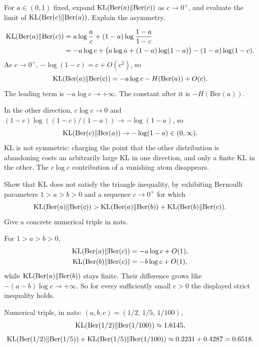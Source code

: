 \begin{hwqbox}
For $a\in(0,1)$ fixed, expand $\mathrm{KL}(\mathrm{Ber}(a)\Vert\mathrm{Ber}(c))$ as $c\to 0^+$, and evaluate the limit of $\mathrm{KL}(\mathrm{Ber}(c)\Vert\mathrm{Ber}(a))$. Explain the asymmetry.
\end{hwqbox}
\begin{hwsolbox}
\begin{align*}
\mathrm{KL}(\mathrm{Ber}(a)\Vert\mathrm{Ber}(c))
&=a\log\frac ac+(1-a)\log\frac{1-a}{1-c}\\
&=-a\log c+\bigl(a\log a+(1-a)\log(1-a)\bigr)-(1-a)\log(1-c).
\end{align*}
As $c\to 0^+$, $-\log(1-c)=c+O(c^2)$, so
\[
\mathrm{KL}(\mathrm{Ber}(a)\Vert\mathrm{Ber}(c))
=-a\log c-H(\mathrm{Ber}(a))+O(c).
\]
The leading term is $-a\log c\to+\infty$. The constant after it is $-H(\mathrm{Ber}(a))$.

In the other direction, $c\log c\to 0$ and $(1-c)\log((1-c)/(1-a))\to-\log(1-a)$, so
\[
\mathrm{KL}(\mathrm{Ber}(c)\Vert\mathrm{Ber}(a))\to-\log(1-a)\in(0,\infty).
\]
KL is not symmetric: charging the point that the other distribution is abandoning costs an arbitrarily large KL in one direction, and only a finite KL in the other. The $c\log c$ contribution of a vanishing atom disappears.
\end{hwsolbox}

\begin{hwqbox}
Show that KL does not satisfy the triangle inequality, by exhibiting Bernoulli parameters $1>a>b>0$ and a sequence $c\to 0^+$ for which
\[
\mathrm{KL}(\mathrm{Ber}(a)\Vert\mathrm{Ber}(c))
>\mathrm{KL}(\mathrm{Ber}(a)\Vert\mathrm{Ber}(b))+\mathrm{KL}(\mathrm{Ber}(b)\Vert\mathrm{Ber}(c)).
\]
Give a concrete numerical triple in nats.
\end{hwqbox}
\begin{hwsolbox}
For $1>a>b>0$,
\begin{align*}
\mathrm{KL}(\mathrm{Ber}(a)\Vert\mathrm{Ber}(c))&=-a\log c+O(1),\\
\mathrm{KL}(\mathrm{Ber}(b)\Vert\mathrm{Ber}(c))&=-b\log c+O(1),
\end{align*}
while $\mathrm{KL}(\mathrm{Ber}(a)\Vert\mathrm{Ber}(b))$ stays finite. Their difference grows like $-(a-b)\log c\to+\infty$. So for every sufficiently small $c>0$ the displayed strict inequality holds.

Numerical triple, in nats: $(a,b,c)=(1/2,\,1/5,\,1/100)$,
\[
\mathrm{KL}(\mathrm{Ber}(1/2)\Vert\mathrm{Ber}(1/100))\approx 1.6145,
\]
\[
\mathrm{KL}(\mathrm{Ber}(1/2)\Vert\mathrm{Ber}(1/5))+\mathrm{KL}(\mathrm{Ber}(1/5)\Vert\mathrm{Ber}(1/100))\approx 0.2231+0.4287=0.6518.
\]
\end{hwsolbox}
